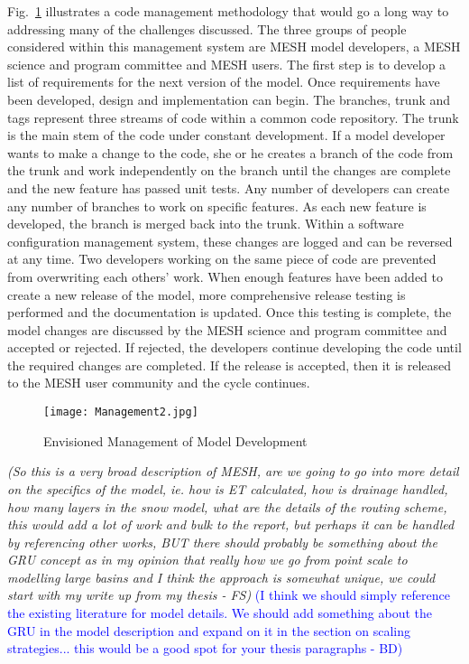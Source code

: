 \documentclass[hess]{copernicus}
\begin{document}
Fig.~\ref{management} illustrates a code management methodology that would go a long way to addressing many of the challenges discussed. The three groups of people considered within this management system are MESH model developers, a MESH science and program committee and MESH users. The first step is to develop a list of requirements for the next version of the model. Once requirements have been developed, design and implementation can begin. The branches, trunk and tags represent three streams of code within a common code repository. The trunk is the main stem of the code under constant development. If a model developer wants to make a change to the code, she or he creates a branch of the code from the trunk and work independently on the branch until the changes are complete and the new feature has passed unit tests. Any number of developers can create any number of branches to work on specific features. As each new feature is developed, the branch is merged back into the trunk. Within a software configuration management system, these changes are logged and can be reversed at any time. Two developers working on the same piece of code are prevented from overwriting each others' work. When enough features have been added to create a new release of the model, more comprehensive release testing is performed and the documentation is updated. Once this testing is complete, the model changes are discussed by the MESH science and program committee and accepted or rejected. If rejected, the developers continue developing the code until the required changes are completed. If the release is accepted, then it is released to the MESH user community and the cycle continues.

\begin{figure}[h!]
\vspace*{2mm}
\begin{center}
\texttt{[image: Management2.jpg]}
\end{center}
\caption{Envisioned Management of Model Development}
\label{management}
\end{figure}

{\em (So this is a very broad description of MESH, are we going to go into more detail on the specifics of the model, ie. how is ET calculated, how is drainage handled, how many layers in the snow model, what are the details of the routing scheme, this would add a lot of work and bulk to the report, but perhaps it can be handled by referencing other works, BUT there should probably be something about the GRU concept as in my opinion that really how we go from point scale to modelling large basins and I think the approach is somewhat unique, we could start with my write up from my thesis - FS)}\textcolor{blue}{ (I think we should simply reference the existing literature for model details. We should add something about the GRU in the model description and expand on it in the section on scaling strategies... this would be a good spot for your thesis paragraphs - BD)}
\end{document}
